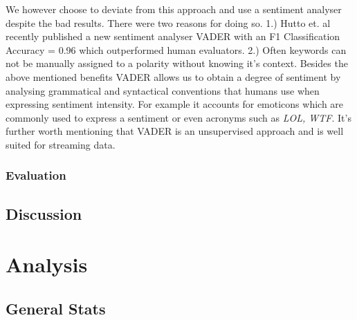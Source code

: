 We however choose to deviate from this approach and use a sentiment analyser despite the bad results. There were two reasons for doing so. 1.) Hutto et. al recently published a new sentiment analyser VADER \cite{hutton14} with an F1 Classification Accuracy = 0.96 which  outperformed human evaluators. 2.) Often keywords can not be manually assigned to a polarity without knowing it's context. Besides the above mentioned benefits VADER allows us to obtain a degree of sentiment by analysing grammatical and syntactical conventions that humans use when expressing sentiment intensity. For example it accounts for emoticons which are commonly used to express a sentiment or even acronyms such as \emph{LOL, WTF}. It's further worth mentioning that VADER is an unsupervised approach and is well suited for streaming data. 


\subsection{Evaluation}






\section {Discussion}




\chapter{Analysis}

\section{General Stats}

